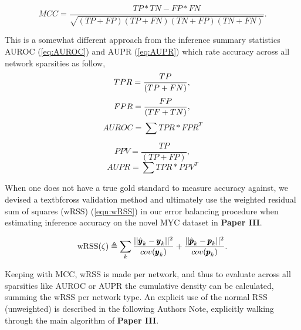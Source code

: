 \begin{equation}\label{eq:MCC}
MCC=\frac{TP*TN-FP*FN}{\sqrt{(TP+FP)(TP+FN)(TN+FP)(TN+FN)}}.
\end{equation}

This is a somewhat different approach from the inference summary statistics AUROC (\cref{eq:AUROC}) and AUPR (\cref{eq:AUPR}) which rate accuracy across all network sparsities as follow,
\begin{equation}\label{eq:TPR}
TPR=\frac{TP}{(TP+FN)},\\ \end{equation}
\begin{equation}\label{eq:FPR}
FPR=\frac{FP}{(TF+TN)},\\ \end{equation}
\begin{equation}\label{eq:AUROC}
AUROC=\sum{TPR*FPR^T}
\end{equation}

\begin{equation}\label{eq:PPV} 
PPV=\frac{TP}{(TP+FP)},\end{equation}
\begin{equation}\label{eq:AUPR}
AUPR=\sum{TPR*PPV^T}
\end{equation}


When one does not have a true gold standard to measure accuracy against, we devised a textbf{cross validation} method and ultimately use the weighted residual sum of squares (wRSS) (\cref{eqn:wRSS}) in our error balancing procedure when estimating inference accuracy on the novel MYC dataset in \textbf{Paper III}.

\begin{equation}\label{eqn:wRSS}
  \textrm{wRSS}(\zeta) \triangleq \sum_k \frac{||\hat{{\pmb{y}}}_k-{\pmb{y}}_k||^2}{cov({\pmb{y}}_k)}+\frac{||\hat{{\pmb{p}}}_k-{\pmb{p}}_k||^2}{cov({\pmb{p}}_k)}.
\end{equation}

Keeping with MCC, wRSS is made per network, and thus to evaluate across all sparsities like AUROC or AUPR the cumulative density can be calculated, summing the wRSS per network type. An explicit use of the normal RSS (unweighted) is described in the following Authors Note, explicitly walking through the main algorithm of \textbf{Paper III}.\\

